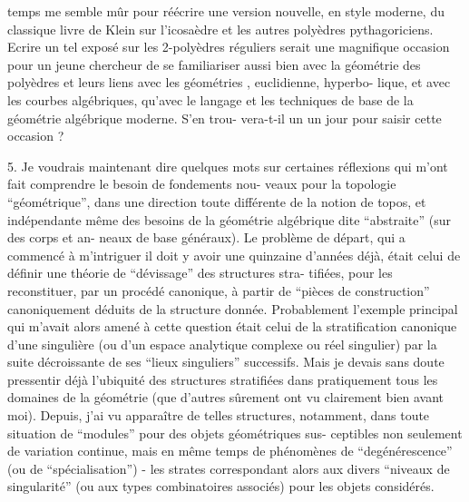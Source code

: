 
temps me semble mûr pour réécrire une version nouvelle, en style
moderne, du classique livre de Klein sur l'icosaèdre et les autres
polyèdres pythagoriciens. Ecrire un tel exposé sur les 2-polyèdres
réguliers serait une magnifique occasion pour un jeune chercheur
de se familiariser aussi bien avec la géométrie des polyèdres et
leurs liens avec les géométries , euclidienne, hyperbo-%
lique, et avec les courbes algébriques, qu'avec le langage et les
techniques de base de la géométrie algébrique moderne. S'en trou-%
vera-t-il un un jour pour saisir cette occasion ?

5. \qquad Je voudrais maintenant dire quelques mots sur certaines
réflexions qui m'ont fait comprendre le besoin de fondements nou-%
veaux pour la topologie ``géométrique'', dans une direction toute
différente de la notion de topos, et indépendante même des besoins
de la géométrie algébrique dite ``abstraite'' (sur des corps et an-%
neaux de base généraux). Le problème de départ, qui a commencé à
m'intriguer il doit y avoir une quinzaine d'années déjà, était
celui de définir une théorie de ``dévissage'' des structures stra-%
tifiées, pour les reconstituer, par un procédé canonique, à partir
de ``pièces de construction'' canoniquement déduits de la structure
donnée. Probablement l'exemple principal qui m'avait alors amené
à cette question était celui de la stratification canonique d'une
 singulière (ou d'un espace analytique complexe
ou réel singulier) par la suite décroissante de ses ``lieux singuliers''
successifs. Mais je devais sans doute pressentir déjà l'ubiquité
des structures stratifiées dans pratiquement tous les domaines de
la géométrie (que d'autres sûrement ont vu clairement bien avant
moi). Depuis, j'ai vu apparaître de telles structures, notamment,
dans toute situation de ``modules'' pour des objets géométriques sus-%
ceptibles non seulement de variation continue, mais en même temps
de phénomènes de ``degénérescence'' (ou de ``spécialisation'') - les
strates correspondant alors aux divers ``niveaux de singularité''
(ou aux types combinatoires associés) pour les objets considérés.

